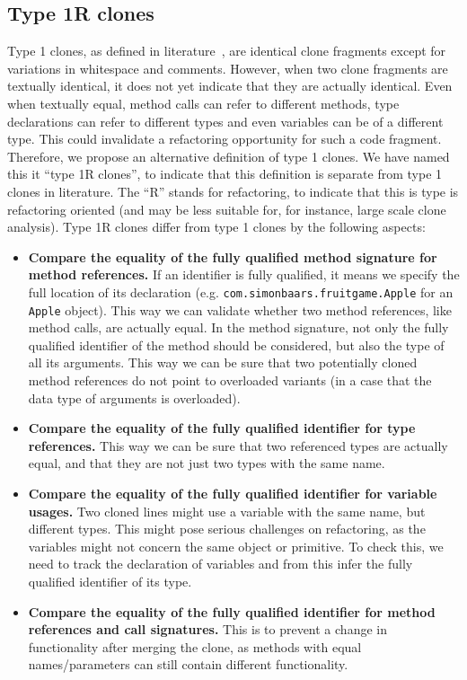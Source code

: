 \documentclass[a4paper]{article}
\begin{document}
\subsection{Type 1R clones} \label{chap:type1clones}
Type 1 clones, as defined in literature~\cite{roy2007survey}, are identical clone fragments except for variations in whitespace and comments. However, when two clone fragments are textually identical, it does not yet indicate that they are actually identical. Even when textually equal, method calls can refer to different methods, type declarations can refer to different types and even variables can be of a different type. This could invalidate a refactoring opportunity for such a code fragment. Therefore, we propose an alternative definition of type 1 clones. We have named this it ``type 1R clones'', to indicate that this definition is separate from type 1 clones in literature. The ``R'' stands for refactoring, to indicate that this is type is refactoring oriented (and may be less suitable for, for instance, large scale clone analysis). Type 1R clones differ from type 1 clones by the following aspects:
\begin{itemize}
  \item \textbf{Compare the equality of the fully qualified method signature for method references.} If an identifier is fully qualified, it means we specify the full location of its declaration (e.g. \texttt{com.simonbaars.fruitgame.Apple} for an \texttt{Apple} object). This way we can validate whether two method references, like method calls, are actually equal. In the method signature, not only the fully qualified identifier of the method should be considered, but also the type of all its arguments. This way we can be sure that two potentially cloned method references do not point to overloaded variants (in a case that the data type of arguments is overloaded).
  \item \textbf{Compare the equality of the fully qualified identifier for type references.} This way we can be sure that two referenced types are actually equal, and that they are not just two types with the same name.
  \item \textbf{Compare the equality of the fully qualified identifier for variable usages.} Two cloned lines might use a variable with the same name, but different types. This might pose serious challenges on refactoring, as the variables might not concern the same object or primitive. To check this, we need to track the declaration of variables and from this infer the fully qualified identifier of its type.
  \item \textbf{Compare the equality of the fully qualified identifier for method references and call signatures.} This is to prevent a change in functionality after merging the clone, as methods with equal names/parameters can still contain different functionality.
\end{itemize}
\end{document}
